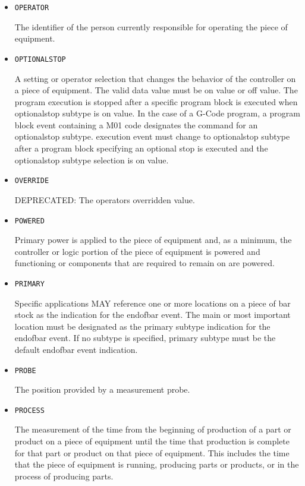 \begin{itemize}
\item \texttt{OPERATOR}  

The identifier of the person currently responsible for operating the piece of equipment.


\item \texttt{OPTIONAL\textunderscore STOP}  

A setting or operator selection that changes the behavior of the controller on a piece of equipment. 
 The valid data value must be on value or off value.
 The program execution is stopped after a specific program block is executed when optionalstop subtype is on value.    
 In the case of a G-Code program, a program block event containing a M01 code designates the command for an optionalstop subtype. 
 execution event must change to optionalstop subtype after a program block specifying an optional stop is executed and the optionalstop subtype selection is on value.


\item \texttt{OVERRIDE}  

DEPRECATED: The operators overridden value.


\item \texttt{POWERED}  

Primary  power is  applied  to the  piece  of  equipment and,  as  a minimum, the controller or logic portion of the piece of equipment is powered and functioning or components that are required to remain on are powered.


\item \texttt{PRIMARY}  

Specific applications MAY reference one or more locations on a piece of bar stock as the indication for the endofbar event. The main or most important location must be designated as the primary subtype indication for the endofbar event.   
 If no subtype is specified, primary subtype must be the default endofbar event indication.


\item \texttt{PROBE}  

The position provided by a measurement probe.


\item \texttt{PROCESS}  

The measurement of the time from the beginning of production of a part or product on a piece of equipment until the time that production is complete for that part or product on that piece of equipment.  This includes the time that the piece of equipment is running, producing parts or products, or in the process of producing parts.



\end{itemize}
